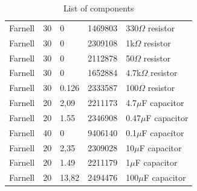 \begin{table}[h]
\begin{tabular}{lllll}
        Farnell     & 30     & 0             & 1469803                & 330$\Omega$ resistor            \\
        Farnell     & 30     & 0             & 2309108                & 1k$\Omega$ resistor             \\
        Farnell     & 30     & 0             & 2112878                & 50$\Omega$ resistor             \\
        Farnell     & 30     & 0             & 1652884                & 4.7k$\Omega$ resistor           \\
        Farnell     & 30     & 0.126         & 2333587                & 100$\Omega$ resistor            \\
        Farnell     & 20     & 2,09          & 2211173                & 4.7$\mu$F capacitor             \\
        Farnell     & 20     & 1.55          & 2346908                & 0.47$\mu$F capacitor            \\
        Farnell     & 40     & 0             & 9406140                & 0.1$\mu$F capacitor             \\
        Farnell     & 20     & 2,35          & 2309028                & 10$\mu$F capacitor              \\
        Farnell     & 20     & 1.49          & 2211179                & 1$\mu$F capacitor               \\
        Farnell     & 20     & 13,82         & 2494476                & 100$\mu$F capacitor
    \end{tabular}
    \caption{List of components}
    \label{listofcomponents}
\end{table}

